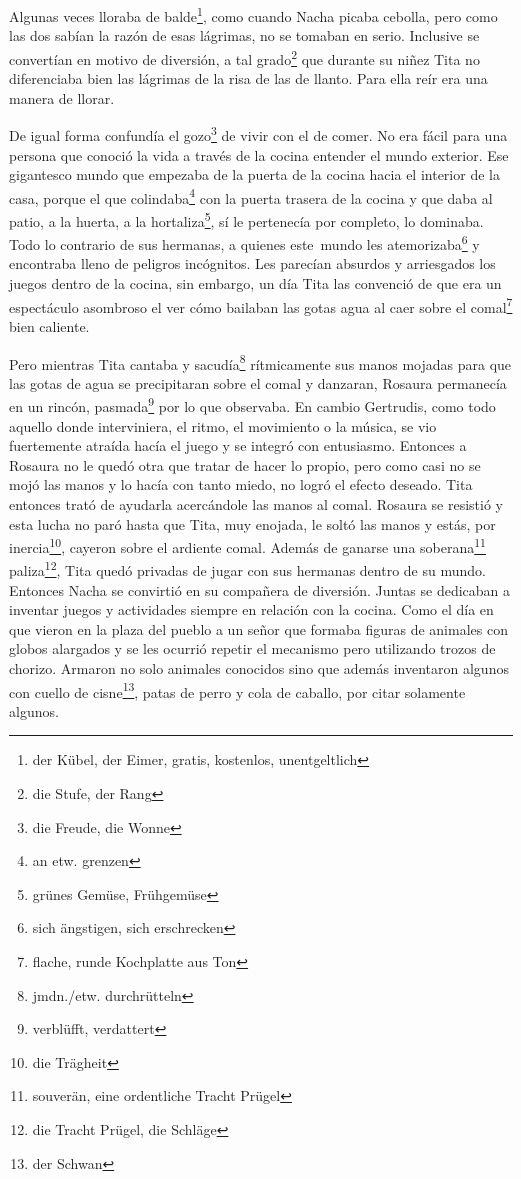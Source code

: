 Algunas veces lloraba de balde\footnote{der Kübel, der Eimer, gratis, kostenlos, unentgeltlich},
como cuando Nacha picaba cebolla, pero como las dos sabían la razón de
esas lágrimas, no se tomaban en serio.
Inclusive se convertían en motivo de diversión, a tal grado\footnote{die Stufe, der Rang}
que durante su niñez Tita no diferenciaba bien las lágrimas de la risa de las de
llanto. Para ella reír era una manera de llorar.

De igual forma confundía el gozo\footnote{die Freude, die Wonne}
de vivir con el de comer. No era fácil para una persona que conoció la
vida a través de la cocina entender el mundo exterior. Ese gigantesco
mundo que empezaba de la puerta de la cocina hacia el interior de la casa,
porque el que colindaba\footnote{an etw. grenzen} con
la puerta trasera de la cocina y que daba al patio, a la huerta, a la hortaliza\footnote{grünes Gemüse, Frühgemüse}, sí le pertenecía
por completo, lo dominaba. Todo lo contrario de sus hermanas, a quienes
este~mundo les atemorizaba\footnote{sich ängstigen, sich erschrecken}
y encontraba lleno de peligros incógnitos. Les parecían absurdos y
arriesgados los juegos dentro de la cocina, sin embargo, un día Tita
las convenció de que era un espectáculo asombroso el ver cómo bailaban
las gotas agua al caer sobre el comal\footnote{flache, runde Kochplatte aus Ton}
bien caliente.

Pero mientras Tita cantaba y sacudía\footnote{jmdn./etw. durchrütteln}
rítmicamente sus manos mojadas para que las gotas de agua se precipitaran
sobre el comal y \glqq{}danzaran\grqq{}, Rosaura permanecía en un rincón, pasmada\footnote{verblüfft, verdattert} por lo que observaba. En
cambio Gertrudis, como todo aquello donde interviniera, el ritmo, el movimiento
o la música, se vio fuertemente atraída hacía el juego y se integró con
entusiasmo. Entonces a Rosaura no le quedó otra que tratar de hacer lo
propio, pero como casi no se mojó las manos y lo hacía con tanto miedo,
no logró el efecto deseado. Tita entonces trató de ayudarla acercándole
las manos al comal. Rosaura se resistió y esta lucha no paró hasta que
Tita, muy enojada, le soltó las manos y estás, por inercia\footnote{die Trägheit},
cayeron sobre el ardiente comal. Además de ganarse una soberana\footnote{souverän, eine ordentliche Tracht Prügel} paliza\footnote{die Tracht Prügel, die Schläge}, Tita quedó privadas
de jugar con sus hermanas dentro de su mundo. Entonces Nacha se convirtió
en su compañera de diversión. Juntas se dedicaban a inventar juegos y
actividades siempre en relación con la cocina. Como el día en que vieron
en la plaza del pueblo a un señor que formaba figuras de animales con
globos alargados y se les ocurrió repetir el mecanismo pero utilizando
trozos de chorizo. Armaron no solo animales conocidos sino que además
inventaron algunos con cuello de cisne\footnote{der Schwan},
patas de perro y cola de caballo, por citar solamente algunos.

